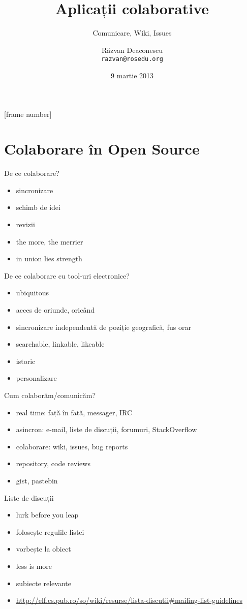 \documentclass{beamer}
\title[Colaborare]{Aplicații colaborative}
\subtitle{Comunicare, Wiki, Issues}
\date{9 martie 2013}
\author[Răzvan]{Răzvan Deaconescu \\ \texttt{razvan@rosedu.org}}
\begin{document}
[frame number]

\frame{\titlepage}

\section{Colaborare în Open Source}

\begin{frame}{De ce colaborare?}
  \begin{itemize}
    \pause
    \item sincronizare
    \item schimb de idei
    \item revizii
    \item the more, the merrier
    \item in union lies strength
  \end{itemize}
\end{frame}

\begin{frame}{De ce colaborare cu tool-uri electronice?}
  \begin{itemize}
    \pause
    \item ubiquitous
    \item acces de oriunde, oricând
    \item sincronizare independentă de poziție geografică, fus orar
    \item searchable, linkable, likeable
    \item istoric
    \item personalizare
  \end{itemize}
\end{frame}

\begin{frame}{Cum colaborăm/comunicăm?}
  \begin{itemize}
    \item real time: față în față, messager, IRC
    \item asincron: e-mail, liste de discuții, forumuri, StackOverflow
    \item colaborare: wiki, issues, bug reports
    \item repository, code reviews
    \item gist, pastebin
  \end{itemize}
\end{frame}

\begin{frame}{Liste de discuții}
  \begin{itemize}
    \item lurk before you leap
    \item folosește regulile listei
    \item vorbește la obiect
    \item less is more
    \item subiecte relevante
    \item
      \url{http://elf.cs.pub.ro/so/wiki/resurse/lista-discutii\#mailing-list-guidelines}
  \end{itemize}
\end{frame}
\end{document}
